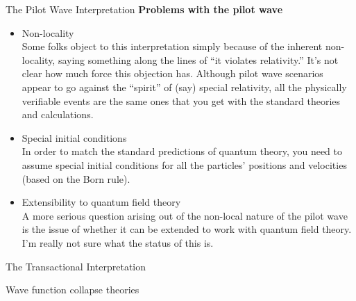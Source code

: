 \documentclass[9pt,usenames,dvipsnames]{beamer}
\begin{document}
\begin{frame}[t]{The Pilot Wave Interpretation}
\vspace{0pt}
{\bf Problems with the pilot wave}
\begin{itemize}
\vspace{6pt}
\item Non-locality
\vspace{6pt}\\
    Some folks object to this interpretation simply because of the inherent
    non-locality, saying something along the lines of 
    ``it violates relativity.'' It's not clear how much force this objection
    has. Although pilot wave scenarios appear to go against the ``spirit''
    of (say) special relativity, all the physically verifiable events are the
    same ones that you get with the standard theories and calculations.
\vspace{6pt}
\item Special initial conditions
    \vspace{6pt}\\
    In order to match the standard predictions of quantum theory, you need
    to assume special initial conditions for all the particles' positions
    and velocities (based on the Born rule).
\vspace{6pt}
\item Extensibility to quantum field theory
    \vspace{6pt}\\
    A more serious question arising out of the non-local nature of the
    pilot wave is the issue of whether it can be extended to work with
    quantum field theory. I'm really not sure what the status of this is.

\end{itemize}
\end{frame}

\begin{frame}[t]{The Transactional Interpretation}
\end{frame}

\begin{frame}[t]{Wave function collapse theories}
\end{frame}
\end{document}
